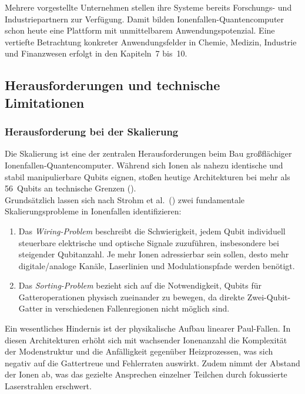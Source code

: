 Mehrere vorgestellte Unternehmen stellen ihre Systeme bereits Forschungs- und Industriepartnern zur Verfügung. Damit bilden Ionenfallen-Quantencomputer schon heute eine Plattform mit unmittelbarem Anwendungspotenzial. Eine vertiefte Betrachtung konkreter Anwendungsfelder in Chemie, Medizin, Industrie und Finanzwesen erfolgt in den Kapiteln~7 bis~10.

\subsection{Herausforderungen und technische Limitationen}
\subsubsection{Herausforderung bei der Skalierung}
Die Skalierung ist eine der zentralen Herausforderungen beim Bau großflächiger Ionenfallen-Quantencomputer. Während sich Ionen als nahezu identische und stabil manipulierbare Qubits eignen, stoßen heutige Architekturen bei mehr als 56~Qubits an technische Grenzen (\cite{strohmIonBasedQuantumComputing2024, bischoffWettkampfQubits2024}). \\

Grundsätzlich lassen sich nach Strohm et al.\ (\cite{strohmIonBasedQuantumComputing2024}) zwei fundamentale Skalierungsprobleme in Ionenfallen identifizieren:
\begin{enumerate}
    \item Das \textit{Wiring-Problem} beschreibt die Schwierigkeit, jedem Qubit individuell steuerbare elektrische und optische Signale zuzuführen, insbesondere bei steigender Qubitanzahl. Je mehr Ionen adressierbar sein sollen, desto mehr digitale/analoge Kanäle, Laserlinien und Modulationspfade werden benötigt.
    \item Das \textit{Sorting-Problem} bezieht sich auf die Notwendigkeit, Qubits für Gatteroperationen physisch zueinander zu bewegen, da direkte Zwei-Qubit-Gatter in verschiedenen Fallenregionen nicht möglich sind.
\end{enumerate}

Ein wesentliches Hindernis ist der physikalische Aufbau linearer Paul-Fallen. In diesen Architekturen erhöht sich mit wachsender Ionenanzahl die Komplexität der Modenstruktur und die Anfälligkeit gegenüber Heizprozessen, was sich negativ auf die Gattertreue und Fehlerraten auswirkt. Zudem nimmt der Abstand der Ionen ab, was das gezielte Ansprechen einzelner Teilchen durch fokussierte Laserstrahlen erschwert. \\

